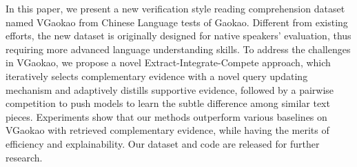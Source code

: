 In this paper, we present a new verification style reading comprehension dataset named VGaokao from Chinese Language tests of Gaokao. Different from existing efforts, the new dataset is originally designed for native speakers' evaluation, thus requiring more advanced language understanding skills. To address the challenges in VGaokao, we propose a novel Extract-Integrate-Compete approach, which iteratively selects complementary evidence with a novel query updating mechanism and adaptively distills supportive evidence, followed by a pairwise competition to push models to learn the subtle difference among similar text pieces. Experiments show that our methods outperform various baselines on VGaokao with retrieved complementary evidence, while having the merits of efficiency and explainability. Our dataset and code are released for further research.
